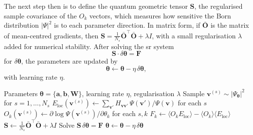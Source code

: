 \documentclass[10pt,a4paper]{article}
\numberwithin{equation}{section}
\begin{document}
The next step then is to define the quantum geometric tensor $\mathbf{S}$, the regularised sample covariance of the $O_k$ vectors, which measures how sensitive the Born distribution $|\Psi|^2$ is to each parameter direction. In matrix form, if $\bar{\mathbf{O}}$ is the matrix of mean-centred gradients, then $\mathbf{S} = \frac{1}{N_s}\bar{\mathbf{O}}^\top \bar{\mathbf{O}} + \lambda I$, with a small regularisation $\lambda$ added for numerical stability. After solving the \gls{sr} system
\begin{equation}
\label{eq:srsystem}
\mathbf{S} \cdot \delta\boldsymbol{\theta} = \mathbf{F}
\end{equation}
for $\delta\boldsymbol{\theta}$, the parameters are updated by
\begin{equation}
    \boldsymbol{\theta} \leftarrow \boldsymbol{\theta} - \eta\,\delta\boldsymbol{\theta},
\end{equation}
with learning rate $\eta$.
\begin{algorithm}
\caption{\gls{sr}}
\begin{algorithmic}[1]
\Require Parameters $\boldsymbol{\theta} = \{\mathbf{a}, \mathbf{b}, \mathbf{W}\}$,
         learning rate $\eta$, regularisation $\lambda$
    \State Sample $\mathbf{v}^{(s)} \sim |\Psi_{\boldsymbol{\theta}}|^2$
           for $s = 1, \ldots, N_s$ 
    \State $E_\text{loc}(\mathbf{v}^{(s)}) \leftarrow
           \sum_{\mathbf{v}'} H_{\mathbf{v}\mathbf{v}'}
           \,\Psi(\mathbf{v}')/\Psi(\mathbf{v})$ \quad for each $s$
    \State $O_k(\mathbf{v}^{(s)}) \leftarrow
           \partial \log \Psi(\mathbf{v}^{(s)}) / \partial \theta_k$
           \quad for each $s, k$
    \State $F_k \leftarrow
           \langle O_k E_\text{loc} \rangle -
           \langle O_k \rangle \langle E_\text{loc} \rangle$
    \State $\mathbf{S} \leftarrow \tfrac{1}{N_s}\bar{\mathbf{O}}^\top \bar{\mathbf{O}} + \lambda I$
    \State Solve $\mathbf{S}\,\delta\boldsymbol{\theta} = \mathbf{F}$
    \State $\boldsymbol{\theta} \leftarrow \boldsymbol{\theta} -
           \eta\,\delta\boldsymbol{\theta}$
\EndFor
\end{algorithmic}
\end{algorithm}
\end{document}
